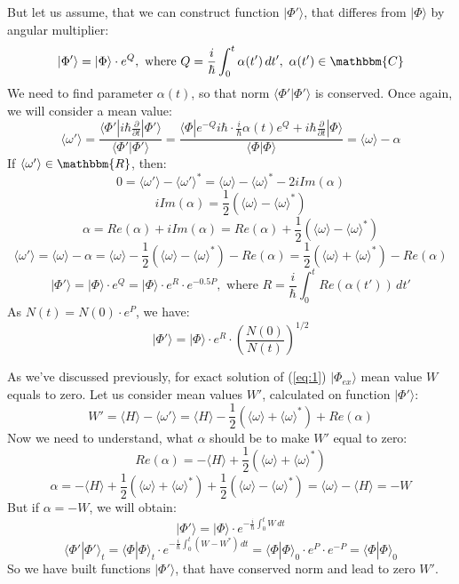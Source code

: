 \documentclass[a4paper,14pt]{extarticle}
\begin{document}
But let us assume, that we can construct function $|\Phi'\rangle$, that differes from $|\Phi\rangle$ by angular multiplier:
$$|\Phi'\rangle = |\Phi\rangle\cdot e^Q,\text{ where } Q = \frac{i}{\hbar}\int_0^t\alpha(t')\,dt',\ \alpha(t')\in\mathbbm{C}$$
We need to find parameter $\alpha(t)$, so that norm $\langle\Phi'|\Phi'\rangle$ is conserved. Once again, we will consider a mean value:
$$\langle\omega'\rangle = \frac{\langle\Phi'|i\hbar\frac{\partial}{\partial t}|\Phi'\rangle}{\langle\Phi'|\Phi'\rangle} = %
			  \frac{\langle\Phi|e^{-Q} i\hbar \cdot \frac{i}{\hbar} \alpha(t) e^Q + %
			   i\hbar\frac{\partial}{\partial t}|\Phi\rangle}{\langle\Phi|\Phi\rangle}=\langle\omega\rangle - \alpha$$
If $\langle\omega'\rangle\in\mathbbm{R}$, then:
$$0 = \langle\omega'\rangle-\langle\omega'\rangle^* = \langle\omega\rangle - \langle\omega\rangle^* - 2i\mathit{Im}( \alpha )$$
$$i\mathit{Im}( \alpha ) = \frac{1}{2}\left( \langle\omega\rangle - \langle\omega\rangle^*\right)$$
$$\alpha = \mathit{Re}( \alpha ) + i\mathit{Im}( \alpha ) = %
	   \mathit{Re}( \alpha ) + \frac{1}{2}\left( \langle\omega\rangle - \langle\omega\rangle^*\right)$$
$$\langle\omega'\rangle = \langle\omega\rangle - \alpha = %
			  \langle\omega\rangle - \frac{1}{2}\left(\langle\omega\rangle - %
								  \langle\omega\rangle^*\right) - \mathit{Re}( \alpha ) = %
			  \frac{1}{2}\left(\langle\omega\rangle + \langle\omega\rangle^*\right) - \mathit{Re}( \alpha )$$
$$|\Phi'\rangle = |\Phi\rangle\cdot e^Q = |\Phi\rangle\cdot e^R\cdot e^{-0.5P},%
					      \text{ where } R = \frac{i}{\hbar}\int_0^t\mathit{Re}(\alpha(t'))\,dt'$$
As $N(t) = N(0)\cdot e^P $, we have:
$$|\Phi'\rangle = |\Phi\rangle\cdot e^R\cdot\left(\frac{N(0)}{N(t)}\right)^{1/2}$$

As we've discussed previously, for exact solution of (\ref{eq:1}) $|\Phi_{ex}\rangle$ mean value $W$ equals to zero.
 Let us consider mean values $W'$, calculated on function $|\Phi'\rangle$:
$$W' = \langle H\rangle - \langle\omega'\rangle = %
		      \langle H\rangle - \frac{1}{2}\left(\langle\omega\rangle+\langle\omega\rangle^*\right)+\mathit{Re}(\alpha)$$
Now we need to understand, what $\alpha$ should be to make $W'$ equal to zero:
$$\mathit{Re}(\alpha) = -\langle H\rangle + \frac{1}{2}\left(\langle\omega\rangle+\langle\omega\rangle^*\right)$$
$$\alpha = -\langle H\rangle + \frac{1}{2}\left(\langle\omega\rangle+\langle\omega\rangle^*\right) +%
			      \frac{1}{2}\left(\langle\omega\rangle-\langle\omega\rangle^*\right)=%
	    \langle\omega\rangle - \langle H\rangle = -W$$
But if $\alpha = -W$, we will obtain:
$$|\Phi'\rangle = |\Phi\rangle\cdot e^{ -\frac{i}{\hbar}\int_0^t W\,dt}$$
$$\langle\Phi'|\Phi'\rangle_t = \langle\Phi|\Phi\rangle_t\cdot e^{ -\frac{i}{\hbar}\int_0^t(W-W^*)\,dt} = %
				\langle\Phi|\Phi\rangle_0\cdot e^P\cdot e^{-P} = \langle\Phi|\Phi\rangle_0$$
So we have built functions $|\Phi'\rangle$, that have conserved norm and lead to zero $W'$. 
\end{document}
